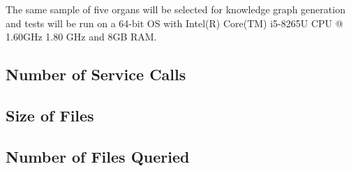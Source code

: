 The same sample of five organs will be selected for knowledge graph generation and tests will be run on a 64-bit OS with Intel(R) Core(TM) i5-8265U CPU @ 1.60GHz 1.80 GHz and 8GB RAM. 

\subsection{Number of Service Calls}
\hspace{0.5cm} 


\subsection{Size of Files}
\hspace{0.5cm} 


\subsection{Number of Files Queried}
\hspace{0.5cm} 

